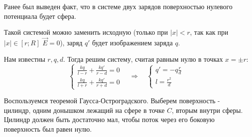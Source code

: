 \documentclass[a4paper,14pt]{extarticle}
\begin{document}
Ранее был выведен факт, что в системе двух зарядов поверхностью нулевого потенциала будет сфера. 

Такой системой можно заменить исходную (только при $|x|<r$, так как при $|x|\in[r;R]$ $\vec{E}=0$), заряд $q'$ будет изображением заряда $q$.

\begin{figure}[H]
    \centering
\end{figure}

Нам известны $r,q,d$. Тогда решим систему, считая равным нулю в точках $x=\pm r$:
\begin{equation}
	\left\{
	\begin{aligned}
 	\frac{kq}{l-r}+\frac{kq'}{r-d}=0\\
 	\frac{kq}{l+r}+\frac{kq'}{r+d}=0
 	\end{aligned}
 	\right. \quad \Rightarrow \quad 
	\left\{
	\begin{aligned}
 	q'=-q\frac{r}{d}\\
 	l=\frac{r^2}{d}
 	\end{aligned}
 	\right. 	
 \end{equation} 

Воспользуемся теоремой Гаусса-Остроградского. Выберем поверхность - цилиндр, одним донышком лежащий на сфере в точке $C$, вторым внутри сферы. Цилиндр должен быть достаточно мал, чтобы поток через его боковую поверхность был равен нулю. 
\end{document}
